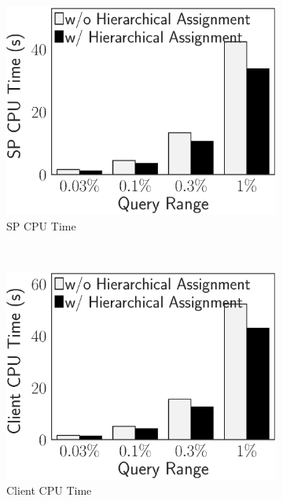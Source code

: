 \begin{figure}[t]
    \centering
    \begin{subfigure}{.33\linewidth}
        \includegraphics[height=\ht\figbox]{exp-figs/access-control/hierarchical_sp.eps}
        \caption{SP CPU Time}
    \end{subfigure}~%
    \begin{subfigure}{.33\linewidth}
        \includegraphics[height=\ht\figbox]{exp-figs/access-control/hierarchical_user.eps}
        \caption{Client CPU Time}
    \end{subfigure}~%
    \begin{subfigure}{.33\linewidth}

\end{subfigure}
\end{figure}
